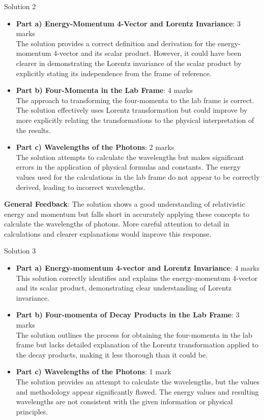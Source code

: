 \documentclass[a4paper,11pt]{article}
\begin{document}
Solution 2

\begin{itemize}
    \item \textbf{Part a) Energy-Momentum 4-Vector and Lorentz Invariance}: 3 marks \\
    The solution provides a correct definition and derivation for the energy-momentum 4-vector and its scalar product. However, it could have been clearer in demonstrating the Lorentz invariance of the scalar product by explicitly stating its independence from the frame of reference.
    
    \item \textbf{Part b) Four-Momenta in the Lab Frame}: 4 marks \\
    The approach to transforming the four-momenta to the lab frame is correct. The solution effectively uses Lorentz transformation but could improve by more explicitly relating the transformations to the physical interpretation of the results.
    
    \item \textbf{Part c) Wavelengths of the Photons}: 2 marks \\
    The solution attempts to calculate the wavelengths but makes significant errors in the application of physical formulas and constants. The energy values used for the calculations in the lab frame do not appear to be correctly derived, leading to incorrect wavelengths.
\end{itemize}

\textbf{General Feedback}: The solution shows a good understanding of relativistic energy and momentum but falls short in accurately applying these concepts to calculate the wavelengths of photons. More careful attention to detail in calculations and clearer explanations would improve this response.

Solution 3

\begin{itemize}
    \item \textbf{Part a) Energy-momentum 4-vector and Lorentz Invariance}: 4 marks \\
    This solution correctly identifies and explains the energy-momentum 4-vector and its scalar product, demonstrating clear understanding of Lorentz invariance.
    
    \item \textbf{Part b) Four-momenta of Decay Products in the Lab Frame}: 3 marks \\
    The solution outlines the process for obtaining the four-momenta in the lab frame but lacks detailed explanation of the Lorentz transformation applied to the decay products, making it less thorough than it could be.
    
    \item \textbf{Part c) Wavelengths of the Photons}: 1 mark \\
    The solution provides an attempt to calculate the wavelengths, but the values and methodology appear significantly flawed. The energy values and resulting wavelengths are not consistent with the given information or physical principles.
\end{itemize}
\end{document}
